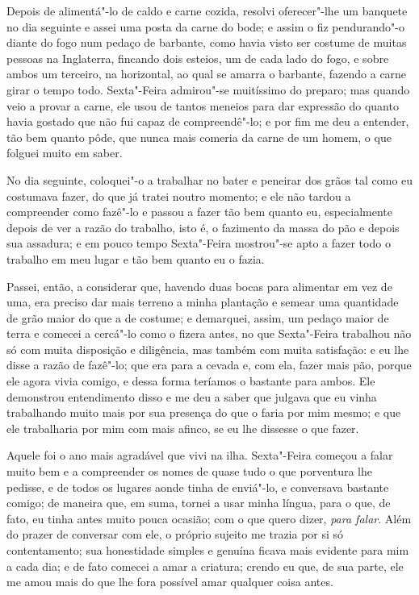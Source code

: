 Depois de alimentá"-lo de caldo e carne cozida, resolvi oferecer"-lhe um
banquete no dia seguinte e assei uma posta da carne do bode; e assim o
fiz pendurando"-o diante do fogo num pedaço de barbante, como havia visto
ser costume de muitas pessoas na Inglaterra, fincando dois esteios, um
de cada lado do fogo, e sobre ambos um terceiro, na horizontal, ao qual
se amarra o barbante, fazendo a carne girar o tempo todo. Sexta"-Feira
admirou"-se muitíssimo do preparo; mas quando veio a provar a carne, ele
usou de tantos meneios para dar expressão do quanto havia gostado que
não fui capaz de compreendê"-lo; e por fim me deu a entender, tão bem
quanto pôde, que nunca mais comeria da carne de um homem, o que folguei
muito em saber.

No dia seguinte, coloquei"-o a trabalhar no bater e peneirar dos grãos
tal como eu costumava fazer, do que já tratei noutro momento; e ele não
tardou a compreender como fazê"-lo e passou a fazer tão bem quanto eu,
especialmente depois de ver a razão do trabalho, isto é, o fazimento da
massa do pão e depois sua assadura; e em pouco tempo Sexta"-Feira
mostrou"-se apto a fazer todo o trabalho em meu lugar e tão bem quanto eu
o fazia.

Passei, então, a considerar que, havendo duas bocas para alimentar em
vez de uma, era preciso dar mais terreno a minha plantação e semear uma
quantidade de grão maior do que a de costume; e demarquei, assim, um
pedaço maior de terra e comecei a cercá"-lo como o fizera antes, no que
Sexta"-Feira trabalhou não só com muita disposição e diligência, mas
também com muita satisfação: e eu lhe disse a razão de fazê"-lo; que era
para a cevada e, com ela, fazer mais pão, porque ele agora vivia comigo,
e dessa forma teríamos o bastante para ambos. Ele demonstrou
entendimento disso e me deu a saber que julgava que eu vinha trabalhando
muito mais por sua presença do que o faria por mim mesmo; e que ele
trabalharia por mim com mais afinco, se eu lhe dissesse o que fazer.

Aquele foi o ano mais agradável que vivi na ilha. Sexta"-Feira começou a
falar muito bem e a compreender os nomes de quase tudo o que porventura
lhe pedisse, e de todos os lugares aonde tinha de enviá"-lo, e conversava
bastante comigo; de maneira que, em suma, tornei a usar minha língua,
para o que, de fato, eu tinha antes muito pouca ocasião; com o que quero
dizer, \emph{para falar}. Além do prazer de conversar com ele, o próprio
sujeito me trazia por si só contentamento; sua honestidade simples e
genuína ficava mais evidente para mim a cada dia; e de fato comecei a
amar a criatura; crendo eu que, de sua parte, ele me amou mais do que
lhe fora possível amar qualquer coisa antes.

